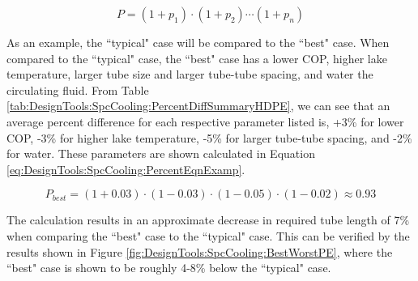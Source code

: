 	\begin{equation}
		P = (1+p_1)\cdot(1+p_2)\cdots(1+p_n)
		\label{eq:DesignTools:SpcCooling:PercentEqn}
	\end{equation}
	
As an example, the ``typical" case will be compared to the ``best" case. When compared to the ``typical" case, the ``best" case has a lower COP, higher lake temperature, larger tube size and larger tube-tube spacing, and water the circulating fluid. From Table \ref{tab:DesignTools:SpcCooling:PercentDiffSummaryHDPE}, we can see that an average percent difference for each respective parameter listed is, +3\% for lower COP, -3\% for higher lake temperature, -5\% for larger tube-tube spacing, and -2\% for water. These parameters are shown calculated in Equation \ref{eq:DesignTools:SpcCooling:PercentEqnExamp}. 

	\begin{equation}
		P_{best} = (1+0.03)\cdot(1-0.03)\cdot(1-0.05)\cdot(1-0.02) \approx 0.93
		\label{eq:DesignTools:SpcCooling:PercentEqnExamp}
	\end{equation}
	
The calculation results in an approximate decrease in required tube length of 7\% when comparing the ``best" case to the ``typical" case. This can be verified by the results shown in Figure \ref{fig:DesignTools:SpcCooling:BestWorstPE}, where the ``best" case is shown to be roughly 4-8\% below the ``typical" case.


